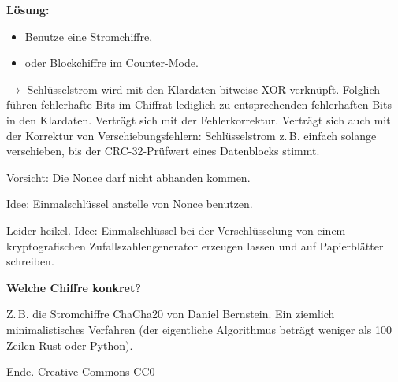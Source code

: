 \documentclass{beamer}
\newcommand{\modest}[1]{{\small\color{gray}#1}}
\newcommand{\strong}[1]{\textsf{\textbf{#1}}}
\begin{document}
\begin{frame}[t]
\vspace{2em}
\strong{Lösung:}
\begin{itemize}
\item Benutze eine Stromchiffre,
\item oder Blockchiffre im Counter-Mode.
\end{itemize}\pause
\vspace{1em}
$\rightarrow$ Schlüsselstrom wird mit den Klardaten bitweise
XOR-verknüpft. Folglich führen fehlerhafte Bits im Chiffrat
lediglich zu entsprechenden fehlerhaften Bits in den Klardaten.
Verträgt sich mit der Fehlerkorrektur. Verträgt sich auch mit
der Korrektur von Verschiebungsfehlern: Schlüsselstrom z.\,B. einfach
solange verschieben, bis der CRC-32-Prüfwert eines Datenblocks
stimmt.
\end{frame}

\begin{frame}
Vorsicht: Die Nonce darf nicht abhanden kommen.\pause

\vspace{1em}
Idee: Einmalschlüssel anstelle von Nonce benutzen.\pause

\vspace{1em}
Leider heikel. Idee: Einmalschlüssel bei der Verschlüsselung
von einem kryptografischen Zufallszahlengenerator erzeugen lassen
und auf Papierblätter schreiben.
\end{frame}

\begin{frame}
\strong{Welche Chiffre konkret?}

\vspace{1em}
Z.\,B. die Stromchiffre ChaCha20 von Daniel
Bernstein. Ein ziemlich minimalistisches Verfahren (der eigentliche
Algorithmus beträgt weniger als 100 Zeilen Rust oder Python).
\end{frame}

\begin{frame}
Ende.
\vfill\hfill
\modest{Creative Commons CC0}
\end{frame}
\end{document}
